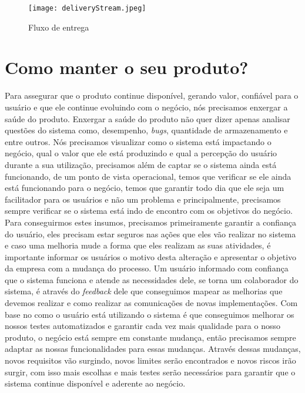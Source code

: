       \begin{figure}[!h]
        \centering
        \texttt{[image: deliveryStream.jpeg]}
        \caption{Fluxo de entrega}
        \label{Imagem:4}
      \end{figure}

  \chapter{Como manter o seu produto?}
    Para assegurar que o produto continue disponível, gerando valor, confiável
    para o usuário e que ele continue evoluindo com o negócio, nós
    precisamos enxergar a saúde do produto. Enxergar a saúde do produto não quer
    dizer apenas analisar questões do sistema como, desempenho, \textit{bugs},
    quantidade de armazenamento e entre outros. Nós precisamos visualizar como o
    sistema está impactando o negócio, qual o valor que ele está produzindo e
    qual a percepção do usuário durante a sua utilização, precisamos além de
    captar se o sistema ainda está funcionando, de um ponto de vista operacional,
    temos que verificar se ele ainda está funcionando para o negócio, temos que
    garantir todo dia que ele seja um facilitador para os usuários e não um
    problema e principalmente, precisamos sempre verificar se o sistema está indo
    de encontro com os objetivos do negócio. \newline
    Para conseguirmos estes insumos, precisamos primeiramente garantir a confiança
    do usuário, eles precisam estar seguros nas ações que eles vão realizar no
    sistema e caso uma melhoria mude a forma que eles realizam as suas atividades,
    é importante informar os usuários o motivo desta alteração e apresentar o
    objetivo da empresa com a mudança do processo. Um usuário informado com
    confiança que o sistema funciona e atende as necessidades dele, se torna
    um colaborador do sistema, é através do \textit{feedback} dele que conseguimos
    mapear as melhorias que devemos realizar e como realizar as comunicações de
    novas implementações. Com base no como o usuário está utilizando o sistema
    é que conseguimos melhorar os nossos testes automatizados e garantir cada vez
    mais qualidade para o nosso produto, o negócio está sempre em constante
    mudança, então precisamos sempre adaptar as nossas funcionalidades para essas
    mudanças. Através dessas mudanças, novos requisitos vão surgindo, novos
    limites serão encontrados e novos riscos irão surgir, com isso mais escolhas
    e mais testes serão necessários para garantir que o sistema continue
    disponível e aderente ao negócio.

